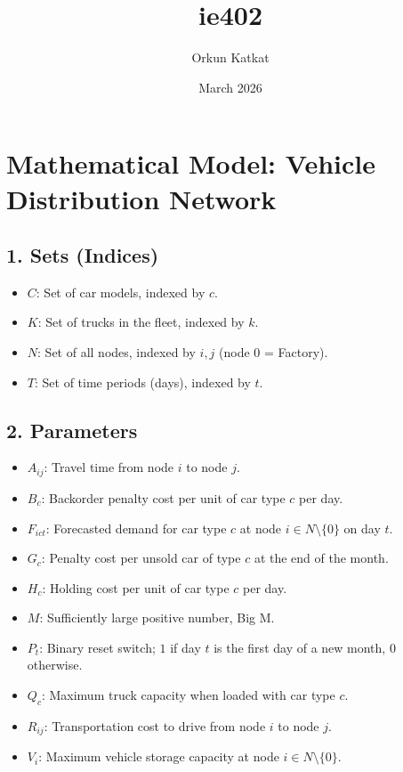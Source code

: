 \documentclass{article}
\title{ie402}
\author{Orkun Katkat}
\date{March 2026}
\begin{document}
\section*{Mathematical Model: Vehicle Distribution Network}

\subsection*{1. Sets (Indices)}
\begin{itemize}
    \item $C$: Set of car models, indexed by $c$.
    \item $K$: Set of trucks in the fleet, indexed by $k$.
    \item $N$: Set of all nodes, indexed by $i, j$ (node $0$ = Factory).
    \item $T$: Set of time periods (days), indexed by $t$.
\end{itemize}

\subsection*{2. Parameters}
\begin{itemize}
    \item $A_{ij}$: Travel time from node $i$ to node $j$.
    \item $B_c$: Backorder penalty cost per unit of car type $c$ per day.
    \item $F_{ict}$: Forecasted demand for car type $c$ at node $i \in N \setminus \{0\}$ on day $t$.
    \item $G_c$: Penalty cost per unsold car of type $c$ at the end of the month.
    \item $H_c$: Holding cost per unit of car type $c$ per day.
    \item $M$: Sufficiently large positive number, Big M.
    \item $P_t$: Binary reset switch; $1$ if day $t$ is the first day of a new month, $0$ otherwise.
    \item $Q_c$: Maximum truck capacity when loaded with car type $c$.
    \item $R_{ij}$: Transportation cost to drive from node $i$ to node $j$.
    \item $V_i$: Maximum vehicle storage capacity at node $i \in N \setminus \{0\}$.
\end{itemize}
\end{document}
